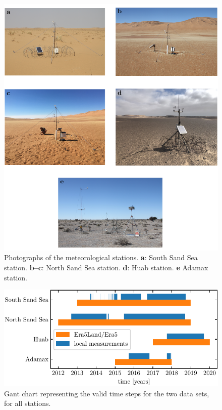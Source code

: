 \begin{figure}[p]
\centering
\includegraphics[scale=1]{Figures/Figure1_supp.pdf}
\caption{Photographs of the meteorological stations. \textbf{a}: South Sand Sea station. \textbf{b--c}: North Sand Sea station. \textbf{d}: Huab station. \textbf{e} Adamax station.}
\label{Fig1_supp}
\end{figure}

\begin{figure}[p]
\centering
\includegraphics[scale=1]{Figures/Figure2_supp.pdf}
\caption{Gant chart representing the valid time steps for the two data sets, for all stations.}
\label{Fig2_supp}
\end{figure}

